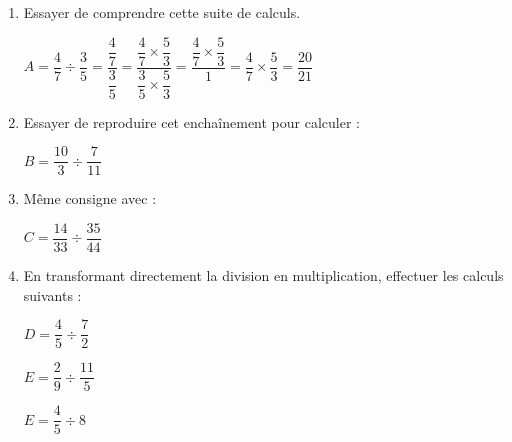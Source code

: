 \documentclass[a4paper]{book}
\begin{document}
    \begin{exercice}
        \begin{enumerate}[leftmargin=*]
            \item Essayer de comprendre cette suite de calculs.

            $A=\dfrac{4}{7}\div\dfrac{3}{5}
            =\dfrac{\dfrac{4}{7}}{\dfrac{3}{5}}
            =\dfrac{\dfrac{4}{7}\times\dfrac{5}{3}}{\dfrac{3}{5}\times\dfrac{5}{3}}
            =\dfrac{\dfrac{4}{7}\times\dfrac{5}{3}}{1}
            =\dfrac{4}{7}\times\dfrac{5}{3}
            =\dfrac{20}{21}$

            \item Essayer de reproduire cet enchaînement pour calculer : 

            \bigskip

            $B=\dfrac{10}{3}\div\dfrac{7}{11}$

            \bigskip

            \item Même consigne avec :

            \bigskip

            $C=\dfrac{14}{33}\div\dfrac{35}{44}$

            \bigskip

            \item En transformant directement la division en multiplication, effectuer les calculs suivants :

                    \medskip
        
            \begin{minipage}{0.30\linewidth}
                $D=\dfrac{4}{5}\div\dfrac{7}{2}$
            \end{minipage}
            \hfill\vline\hfill
            \begin{minipage}{0.30\linewidth}
                $E=\dfrac{2}{9}\div\dfrac{11}{5}$
            \end{minipage}
            \hfill\vline\hfill
            \begin{minipage}{0.30\linewidth}
                $E=\dfrac{4}{5}\div8$
            \end{minipage}
        \end{enumerate}
    \end{exercice}


\setcounter{exo}{1}
\end{document}
